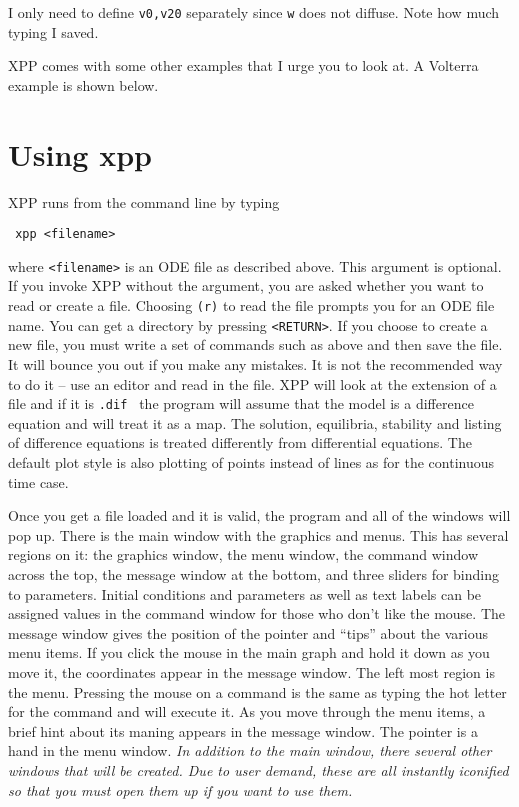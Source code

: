 \documentclass{article}
\newcommand{\bvb}{\begin{verbatim}}
\newcommand{\tc}[1]{\addcontentsline{toc}{subsection}{#1}}
\newcommand{\tcc}[1]{\addcontentsline{toc}{subsubsection}{#1}}
\begin{document}
I only need to define {\tt v0,v20} separately since {\tt w} does not diffuse.
Note how much typing I saved.




\bigskip













XPP comes with some other examples that I urge you to look at. A
Volterra example is shown below.

\section{Using xpp}
XPP runs from the command line by typing
\bvb
 xpp <filename>
\end{verbatim}
where {\tt <filename>} is an ODE file as described above.  This argument is optional.
 If you invoke XPP without the argument, you are asked whether you want to
 read or create a file. Choosing {\tt (r)} to read the file prompts you for an ODE
 file name.  You can get a directory by pressing {\tt <RETURN>}.  If you choose to
create a new file, you must write a set of commands such as above and then
 save the file.  	It will bounce you out if you make any mistakes.
 It is not the recommended way to do it -- use an editor and read in the file.
 XPP will look at the extension of a file and if it is {\tt .dif } the program
 will assume that the model is a difference equation and will treat it as a map.
 The solution, equilibria, stability and listing of difference equations
is treated differently from differential equations.  The default plot style
is also plotting of points instead of lines as for the continuous time case.

\tc{Windows}
\tcc{Main Window}

Once you get a file loaded and it is valid, the program and all of the
windows will pop up.  There is the main window with the graphics and menus.
This has several regions on it: the graphics window, the menu window, the command
 window across the top, the message window at the bottom, and three
sliders for binding to parameters.  Initial
conditions and parameters as well as text labels can be assigned
values in the command window for those who don't like the mouse.  The message
window gives the position of the pointer and ``tips'' about the
various menu items.  If
you click the mouse in the main graph and hold it down as you move it, the
coordinates appear in the message window.  The left
most region is the menu.  Pressing the mouse on a command is the same
as typing the hot letter for the command and will execute it.  As you
move through the menu items, a brief hint about its maning appears in
the message window. The pointer is
a hand in the menu window.  {\em In addition to the main window, there
several other windows that will be created.  Due to user demand, these
are all instantly iconified so that you must open them up if you want
to use them.}
\end{document}
